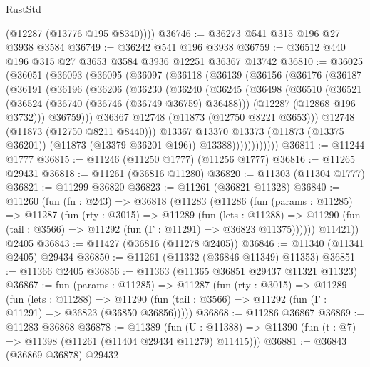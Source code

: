 \begin{lexlean}{RustStd}
\begin{coremodule}
        (@12287 (@13776 @195 @8340))))
@36746 := @36273 @541 @315 @196 @27 @3938 @3584
@36749 := @36242 @541 @196 @3938
@36759 := @36512 @440 @196 @315 @27 @3653 @3584 @3936 @12251 @36367 @13742
@36810 := @36025
    (@36051
      (@36093
        (@36095
          (@36097
            (@36118
              (@36139
                (@36156
                  (@36176
                    (@36187
                      (@36191
                        (@36196
                          (@36206
                            (@36230
                              (@36240
                                (@36245
                                  (@36498
                                    (@36510
                                      (@36521
                                        (@36524 (@36740 (@36746 (@36749 @36759) @36488)))
                                        (@12287 (@12868 @196 @3732)))
                                      @36759)))
                                @36367
                                @12748
                                (@11873 (@12750 @8221 @3653)))
                              @12748
                              (@11873 (@12750 @8211 @8440)))
                            @13367
                            @13370
                            @13373
                            (@11873 (@13375 @36201))
                            (@11873 (@13379 @36201 @196))
                            @13388))))))))))))
@36811 := @11244 @1777
@36815 := @11246 (@11250 @1777) (@11256 @1777)
@36816 := @11265 @29431
@36818 := @11261 (@36816 @11280)
@36820 := @11303 (@11304 @1777)
@36821 := @11299 @36820
@36823 := @11261 (@36821 @11328)
@36840 := @11260
    (fun (fn : @243) =>
    @36818
      (@11283
        (@11286
          (fun (params : @11285) =>
          @11287
            (fun (rty : @3015) =>
            @11289
              (fun (lets : @11288) =>
              @11290 (fun (tail : @3566) => @11292 (fun (Γ : @11291) => @36823 @11375))))))
        @11421))
    @2405
@36843 := @11427 (@36816 (@11278 @2405))
@36846 := @11340 (@11341 @2405) @29434
@36850 := @11261 (@11332 (@36846 @11349) @11353)
@36851 := @11366 @2405
@36856 := @11363 (@11365 @36851 @29437 @11321 @11323)
@36867 := fun (params : @11285) =>
  @11287
    (fun (rty : @3015) =>
    @11289
      (fun (lets : @11288) =>
      @11290 (fun (tail : @3566) => @11292 (fun (Γ : @11291) => @36823 (@36850 @36856)))))
@36868 := @11286 @36867
@36869 := @11283 @36868
@36878 := @11389
    (fun (U : @11388) => @11390 (fun (t : @7) => @11398 (@11261 (@11404 @29434 @11279) @11415)))
@36881 := @36843 (@36869 @36878) @29432

\end{coremodule}
\end{lexlean}
